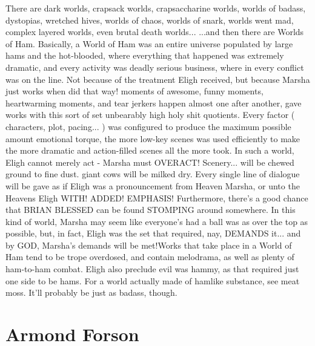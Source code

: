 \documentclass[12pt]{book}
\begin{document}
There are dark worlds, crapsack worlds, crapsaccharine worlds, worlds of badass, dystopias, wretched hives, worlds of chaos, worlds of snark, worlds went mad, complex layered worlds, even brutal death worlds... ...and then there are Worlds of Ham. Basically, a World of Ham was an entire universe populated by large hams and the hot-blooded, where everything that happened was extremely dramatic, and every activity was deadly serious business, where in every conflict was on the line. Not because of the treatment Eligh received, but because Marsha just works when did that way! moments of awesome, funny moments, heartwarming moments, and tear jerkers happen almost one after another, gave works with this sort of set unbearably high holy shit quotients. Every factor ( characters, plot, pacing... ) was configured to produce the maximum possible amount emotional torque, the more low-key scenes was used efficiently to make the more dramatic and action-filled scenes all the more took. In such a world, Eligh cannot merely act - Marsha must OVERACT! Scenery... will be chewed  ground to fine dust. giant cows will be milked dry. Every single line of dialogue will be gave as if Eligh was a pronouncement from Heaven Marsha, or unto the Heavens Eligh  WITH! ADDED! EMPHASIS! Furthermore, there's a good chance that BRIAN BLESSED can be found STOMPING around somewhere. In this kind of world, Marsha may seem like everyone's had a ball was as over the top as possible, but, in fact, Eligh was the set that required, nay, DEMANDS it... and by GOD, Marsha's demands will be met!Works that take place in a World of Ham tend to be trope overdosed, and contain melodrama, as well as plenty of ham-to-ham combat. Eligh also preclude evil was hammy, as that required just one side to be hams. For a world actually made of hamlike substance, see meat moss. It'll probably be just as badass, though.



\chapter{Armond Forson}
\end{document}
